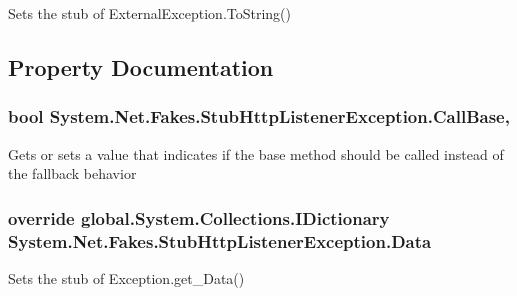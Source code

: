 Sets the stub of External\-Exception.\-To\-String()



\subsection{Property Documentation}
\hypertarget{class_system_1_1_net_1_1_fakes_1_1_stub_http_listener_exception_a32c2ecc12f76e59f7b7badd4a813a103}{
\subsubsection[{Call\-Base}]{\setlength{\rightskip}{0pt plus 5cm}bool System.\-Net.\-Fakes.\-Stub\-Http\-Listener\-Exception.\-Call\-Base\hspace{0.3cm}{\ttfamily [get]}, {\ttfamily [set]}}}\label{class_system_1_1_net_1_1_fakes_1_1_stub_http_listener_exception_a32c2ecc12f76e59f7b7badd4a813a103}


Gets or sets a value that indicates if the base method should be called instead of the fallback behavior

\hypertarget{class_system_1_1_net_1_1_fakes_1_1_stub_http_listener_exception_ae1f6e99b2d6613c2ae3c4ad4601c10a6}{
\subsubsection[{Data}]{\setlength{\rightskip}{0pt plus 5cm}override global.\-System.\-Collections.\-I\-Dictionary System.\-Net.\-Fakes.\-Stub\-Http\-Listener\-Exception.\-Data\hspace{0.3cm}{\ttfamily [get]}}}\label{class_system_1_1_net_1_1_fakes_1_1_stub_http_listener_exception_ae1f6e99b2d6613c2ae3c4ad4601c10a6}


Sets the stub of Exception.\-get\-\_\-\-Data()


